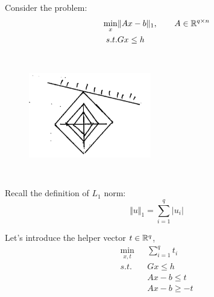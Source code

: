 \begin{example}
	Consider the problem:
	\begin{align*}
		\min_x &\Vert Ax - b\Vert _1, \qquad A\in \mathbb{R}^{q\times n}\\
		s.t. &Gx\leq h
	\end{align*}
	\begin{figure}
		\centering
		\includegraphics[width=2.1in,height=2.1in]{figures/ch07/figure1016_3.png}
	\end{figure}
	
	Recall the definition of $L_1$ norm:
	\begin{equation*}
		\Vert u\Vert_1 = \sum^q_{i=1} |u_i|
	\end{equation*}
	
	
	Let's introduce the helper vector $t\in \mathbb{R}^q$,
	\begin{align*}
		\min_{x,t} &\sum^q_{i=1}t_i\\
		s.t. \quad&Gx \leq h\\
		&Ax -b \leq t\\
		&Ax -b \geq -t
	\end{align*}
	
\end{example}



